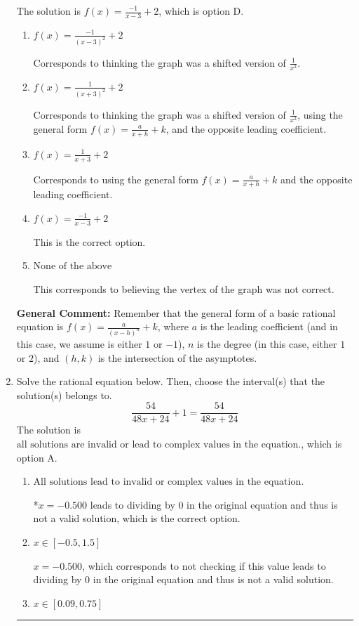 \documentclass{extbook}[14pt]
\newcommand{\litem}[1]{\item #1

\rule{\textwidth}{0.4pt}}
\begin{document}
\begin{enumerate}
{The solution is \( f(x) = \frac{-1}{x - 3} + 2 \), which is option D.\begin{enumerate}[label=\Alph*.]
\item \( f(x) = \frac{-1}{(x - 3)^2} + 2 \)

Corresponds to thinking the graph was a shifted version of $\frac{1}{x^2}$.
\item \( f(x) = \frac{1}{(x + 3)^2} + 2 \)

Corresponds to thinking the graph was a shifted version of $\frac{1}{x^2}$, using the general form $f(x) = \frac{a}{x+h}+k$, and the opposite leading coefficient.
\item \( f(x) = \frac{1}{x + 3} + 2 \)

Corresponds to using the general form $f(x) = \frac{a}{x+h}+k$ and the opposite leading coefficient.
\item \( f(x) = \frac{-1}{x - 3} + 2 \)

This is the correct option.
\item \( \text{None of the above} \)

This corresponds to believing the vertex of the graph was not correct.
\end{enumerate}

\textbf{General Comment:} Remember that the general form of a basic rational equation is $ f(x) = \frac{a}{(x-h)^n} + k$, where $a$ is the leading coefficient (and in this case, we assume is either $1$ or $-1$), $n$ is the degree (in this case, either $1$ or $2$), and $(h, k)$ is the intersection of the asymptotes.
}
\litem{
Solve the rational equation below. Then, choose the interval(s) that the solution(s) belongs to.
\[ \frac{54}{48x + 24} + 1 = \frac{54}{48x + 24} \]
The solution is \( \text{all solutions are invalid or lead to complex values in the equation.} \), which is option A.\begin{enumerate}[label=\Alph*.]
\item \( \text{All solutions lead to invalid or complex values in the equation.} \)

*$x = -0.500$ leads to dividing by 0 in the original equation and thus is not a valid solution, which is the correct option.
\item \( x \in [-0.5,1.5] \)

$x = -0.500$, which corresponds to not checking if this value leads to dividing by 0 in the original equation and thus is not a valid solution.
\item \( x \in [0.09,0.75] \)


\end{enumerate}}
\end{enumerate}
\end{document}
